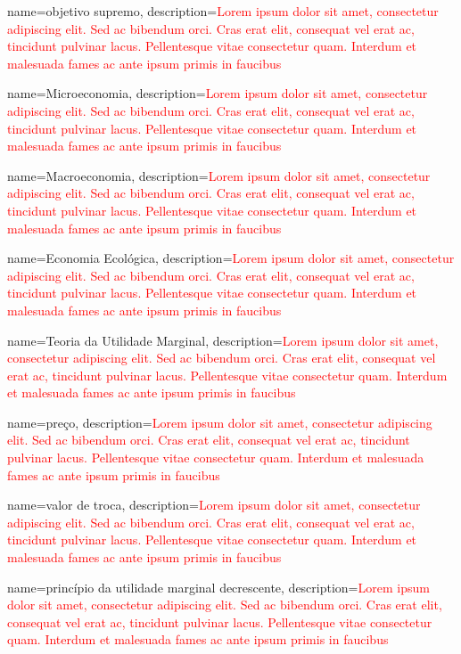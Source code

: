 {
	name=objetivo supremo,
	description={\textcolor{red}{Lorem ipsum dolor sit amet, consectetur adipiscing elit. Sed ac bibendum orci. Cras erat elit, consequat vel erat ac, tincidunt pulvinar lacus. Pellentesque vitae consectetur quam. Interdum et malesuada fames ac ante ipsum primis in faucibus}}
}

{
	name=Microeconomia,
	description={\textcolor{red}{Lorem ipsum dolor sit amet, consectetur adipiscing elit. Sed ac bibendum orci. Cras erat elit, consequat vel erat ac, tincidunt pulvinar lacus. Pellentesque vitae consectetur quam. Interdum et malesuada fames ac ante ipsum primis in faucibus}}
}

{
	name=Macroeconomia,
	description={\textcolor{red}{Lorem ipsum dolor sit amet, consectetur adipiscing elit. Sed ac bibendum orci. Cras erat elit, consequat vel erat ac, tincidunt pulvinar lacus. Pellentesque vitae consectetur quam. Interdum et malesuada fames ac ante ipsum primis in faucibus}}
}

{
	name=Economia Ecológica,
	description={\textcolor{red}{Lorem ipsum dolor sit amet, consectetur adipiscing elit. Sed ac bibendum orci. Cras erat elit, consequat vel erat ac, tincidunt pulvinar lacus. Pellentesque vitae consectetur quam. Interdum et malesuada fames ac ante ipsum primis in faucibus}}
}

{
	name=Teoria da Utilidade Marginal,
	description={\textcolor{red}{Lorem ipsum dolor sit amet, consectetur adipiscing elit. Sed ac bibendum orci. Cras erat elit, consequat vel erat ac, tincidunt pulvinar lacus. Pellentesque vitae consectetur quam. Interdum et malesuada fames ac ante ipsum primis in faucibus}}
}

{
	name=preço,
	description={\textcolor{red}{Lorem ipsum dolor sit amet, consectetur adipiscing elit. Sed ac bibendum orci. Cras erat elit, consequat vel erat ac, tincidunt pulvinar lacus. Pellentesque vitae consectetur quam. Interdum et malesuada fames ac ante ipsum primis in faucibus}}
}

{
	name=valor de troca,
	description={\textcolor{red}{Lorem ipsum dolor sit amet, consectetur adipiscing elit. Sed ac bibendum orci. Cras erat elit, consequat vel erat ac, tincidunt pulvinar lacus. Pellentesque vitae consectetur quam. Interdum et malesuada fames ac ante ipsum primis in faucibus}}
}

{
	name=princípio da utilidade marginal decrescente,
	description={\textcolor{red}{Lorem ipsum dolor sit amet, consectetur adipiscing elit. Sed ac bibendum orci. Cras erat elit, consequat vel erat ac, tincidunt pulvinar lacus. Pellentesque vitae consectetur quam. Interdum et malesuada fames ac ante ipsum primis in faucibus}}
}


